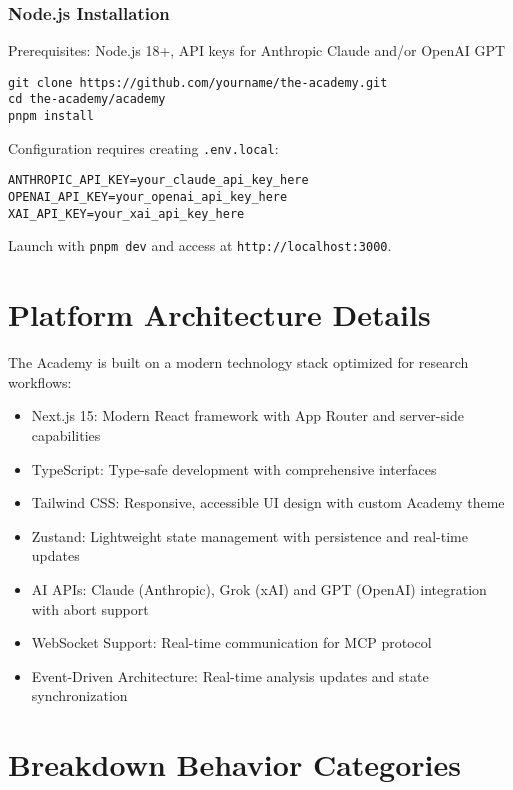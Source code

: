 \documentclass[11pt,letterpaper]{article}
\newcommand{\theacademy}{The Academy}
\begin{document}
\subsubsection{Node.js Installation}
Prerequisites: Node.js 18+, API keys for Anthropic Claude and/or OpenAI GPT

\begin{verbatim}
git clone https://github.com/yourname/the-academy.git
cd the-academy/academy
pnpm install
\end{verbatim}

Configuration requires creating \texttt{.env.local}:
\begin{verbatim}
ANTHROPIC_API_KEY=your_claude_api_key_here
OPENAI_API_KEY=your_openai_api_key_here
XAI_API_KEY=your_xai_api_key_here
\end{verbatim}

Launch with \texttt{pnpm dev} and access at \texttt{http://localhost:3000}.

\section{Platform Architecture Details}
\label{app:architecture}

\theacademy{} is built on a modern technology stack optimized for research workflows:

\begin{itemize}
    \item Next.js 15: Modern React framework with App Router and server-side capabilities
    \item TypeScript: Type-safe development with comprehensive interfaces
    \item Tailwind CSS: Responsive, accessible UI design with custom Academy theme
    \item Zustand: Lightweight state management with persistence and real-time updates
    \item AI APIs: Claude (Anthropic), Grok (xAI) and GPT (OpenAI) integration with abort support
    \item WebSocket Support: Real-time communication for MCP protocol
    \item Event-Driven Architecture: Real-time analysis updates and state synchronization
\end{itemize}

\section{Breakdown Behavior Categories}
\label{app:breakdown}
\end{document}
